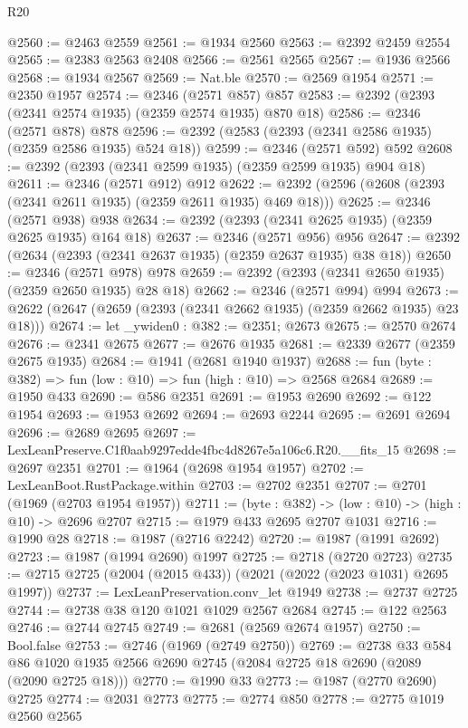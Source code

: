 \begin{lexlean}{R20}
\begin{coremodule}
@2560 := @2463 @2559
@2561 := @1934 @2560
@2563 := @2392 @2459 @2554
@2565 := @2383 @2563 @2408
@2566 := @2561 @2565
@2567 := @1936 @2566
@2568 := @1934 @2567
@2569 := Nat.ble
@2570 := @2569 @1954
@2571 := @2350 @1957
@2574 := @2346 (@2571 @857) @857
@2583 := @2392 (@2393 (@2341 @2574 @1935) (@2359 @2574 @1935) @870 @18)
@2586 := @2346 (@2571 @878) @878
@2596 := @2392 (@2583 (@2393 (@2341 @2586 @1935) (@2359 @2586 @1935) @524 @18))
@2599 := @2346 (@2571 @592) @592
@2608 := @2392 (@2393 (@2341 @2599 @1935) (@2359 @2599 @1935) @904 @18)
@2611 := @2346 (@2571 @912) @912
@2622 := @2392 (@2596 (@2608 (@2393 (@2341 @2611 @1935) (@2359 @2611 @1935) @469 @18)))
@2625 := @2346 (@2571 @938) @938
@2634 := @2392 (@2393 (@2341 @2625 @1935) (@2359 @2625 @1935) @164 @18)
@2637 := @2346 (@2571 @956) @956
@2647 := @2392 (@2634 (@2393 (@2341 @2637 @1935) (@2359 @2637 @1935) @38 @18))
@2650 := @2346 (@2571 @978) @978
@2659 := @2392 (@2393 (@2341 @2650 @1935) (@2359 @2650 @1935) @28 @18)
@2662 := @2346 (@2571 @994) @994
@2673 := @2622 (@2647 (@2659 (@2393 (@2341 @2662 @1935) (@2359 @2662 @1935) @23 @18)))
@2674 := let _ywiden0 : @382 := @2351; @2673
@2675 := @2570 @2674
@2676 := @2341 @2675
@2677 := @2676 @1935
@2681 := @2339 @2677 (@2359 @2675 @1935)
@2684 := @1941 (@2681 @1940 @1937)
@2688 := fun (byte : @382) => fun (low : @10) => fun (high : @10) => @2568 @2684
@2689 := @1950 @433
@2690 := @586 @2351
@2691 := @1953 @2690
@2692 := @122 @1954
@2693 := @1953 @2692
@2694 := @2693 @2244
@2695 := @2691 @2694
@2696 := @2689 @2695
@2697 := LexLeanPreserve.C1f0aab9297edde4fbc4d8267e5a106c6.R20.__fits_15
@2698 := @2697 @2351
@2701 := @1964 (@2698 @1954 @1957)
@2702 := LexLeanBoot.RustPackage.within
@2703 := @2702 @2351
@2707 := @2701 (@1969 (@2703 @1954 @1957))
@2711 := (byte : @382) -> (low : @10) -> (high : @10) -> @2696 @2707
@2715 := @1979 @433 @2695 @2707 @1031
@2716 := @1990 @28
@2718 := @1987 (@2716 @2242)
@2720 := @1987 (@1991 @2692)
@2723 := @1987 (@1994 @2690) @1997
@2725 := @2718 (@2720 @2723)
@2735 := @2715 @2725 (@2004 (@2015 @433)) (@2021 (@2022 (@2023 @1031) @2695 @1997))
@2737 := LexLeanPreservation.conv_let @1949
@2738 := @2737 @2725
@2744 := @2738 @38 @120 @1021 @1029 @2567 @2684
@2745 := @122 @2563
@2746 := @2744 @2745
@2749 := @2681 (@2569 @2674 @1957)
@2750 := Bool.false
@2753 := @2746 (@1969 (@2749 @2750))
@2769 := @2738
    @33
    @584
    @86
    @1020
    @1935
    @2566
    @2690
    @2745
    (@2084 @2725 @18 @2690 (@2089 (@2090 @2725 @18)))
@2770 := @1990 @33
@2773 := @1987 (@2770 @2690) @2725
@2774 := @2031 @2773
@2775 := @2774 @850
@2778 := @2775 @1019 @2560 @2565

\end{coremodule}
\end{lexlean}
